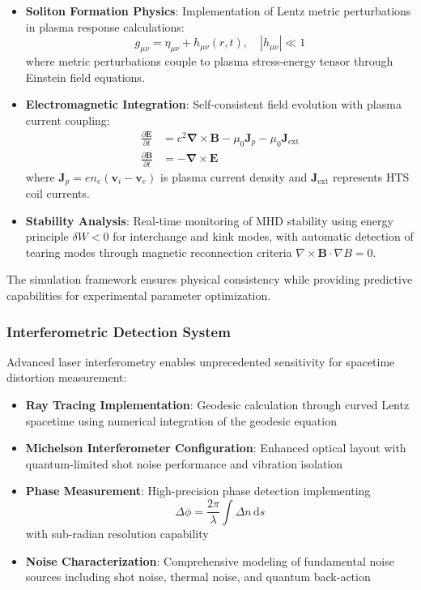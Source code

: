 \documentclass[12pt,a4paper]{article}
\newcommand{\ddt}[1]{\frac{\partial #1}{\partial t}}
\newcommand{\curl}{\boldsymbol{\nabla} \times}
\newcommand{\dd}[1]{\,\mathrm{d}#1}
\begin{document}
\begin{itemize}
\item \textbf{Soliton Formation Physics}: Implementation of Lentz metric perturbations in plasma response calculations:
\begin{equation}
g_{\mu\nu} = \eta_{\mu\nu} + h_{\mu\nu}(r,t), \quad |h_{\mu\nu}| \ll 1
\end{equation}
where metric perturbations couple to plasma stress-energy tensor through Einstein field equations.

\item \textbf{Electromagnetic Integration}: Self-consistent field evolution with plasma current coupling:
\begin{align}
\ddt{\mathbf{E}} &= c^2 \curl \mathbf{B} - \mu_0 \mathbf{J}_p - \mu_0 \mathbf{J}_{\text{ext}} \\
\ddt{\mathbf{B}} &= -\curl \mathbf{E}
\end{align}
where $\mathbf{J}_p = en_e(\mathbf{v}_i - \mathbf{v}_e)$ is plasma current density and $\mathbf{J}_{\text{ext}}$ represents HTS coil currents.

\item \textbf{Stability Analysis}: Real-time monitoring of MHD stability using energy principle $\delta W < 0$ for interchange and kink modes, with automatic detection of tearing modes through magnetic reconnection criteria $\nabla \times \mathbf{B} \cdot \nabla B = 0$.
\end{itemize}

The simulation framework ensures physical consistency while providing predictive capabilities for experimental parameter optimization.

\subsubsection{Interferometric Detection System}

Advanced laser interferometry enables unprecedented sensitivity for spacetime distortion measurement:

\begin{itemize}
\item \textbf{Ray Tracing Implementation}: Geodesic calculation through curved Lentz spacetime using numerical integration of the geodesic equation
\item \textbf{Michelson Interferometer Configuration}: Enhanced optical layout with quantum-limited shot noise performance and vibration isolation
\item \textbf{Phase Measurement}: High-precision phase detection implementing 
\begin{equation}
\Delta\phi = \frac{2\pi}{\lambda} \int \Delta n \dd{s}
\end{equation}
with sub-radian resolution capability
\item \textbf{Noise Characterization}: Comprehensive modeling of fundamental noise sources including shot noise, thermal noise, and quantum back-action
\end{itemize}
\end{document}
